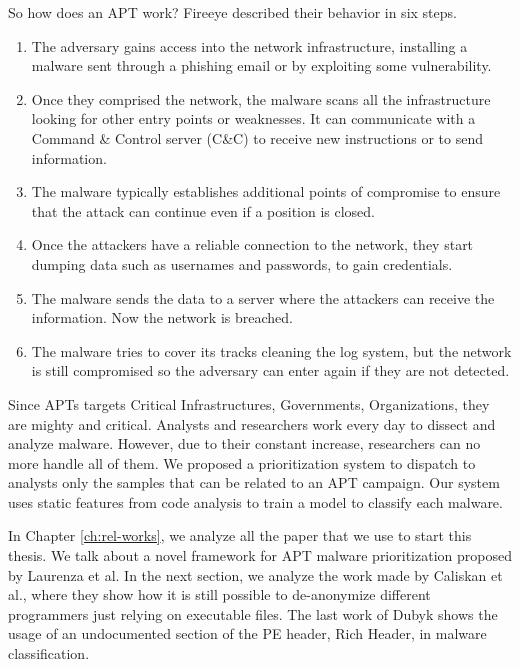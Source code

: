 So how does an APT work? Fireeye described their behavior in six steps. \cite{fireeye_anatomy}

\begin{enumerate}
	\item The adversary gains access into the network infrastructure, installing a malware sent through a phishing email or by exploiting some vulnerability.
	\item Once they comprised the network, the malware scans all the infrastructure looking for other entry points or weaknesses. It can communicate with a Command \& Control server (C\&C) to receive new instructions or to send information.
	\item The malware typically establishes additional points of compromise to ensure that the attack can continue even if a position is closed.
	\item Once the attackers have a reliable connection to the network, they start dumping data such as usernames and passwords, to gain credentials.
	
	\item The malware sends the data to a server where the attackers can receive the information. Now the network is breached.
	
	\item The malware tries to cover its tracks cleaning the log system, but the network is still compromised so the adversary can enter again if they are not detected.
\end{enumerate}

Since APTs targets Critical Infrastructures, Governments, Organizations, they are mighty and critical. Analysts and researchers work every day to dissect and analyze malware. However, due to their constant increase, researchers can no more handle all of them. We proposed a prioritization system to dispatch to analysts only the samples that can be related to an APT campaign. Our system uses static features from code analysis to train a model to classify each malware.

In Chapter \ref{ch:rel-works}, we analyze all the paper that we use to start this thesis. We talk about a novel framework for APT malware prioritization proposed by Laurenza et al. In the next section, we analyze the work made by Caliskan et al., where they show how it is still possible to de-anonymize different programmers just relying on executable files. The last work of Dubyk shows the usage of an undocumented section of the PE header, Rich Header, in malware classification.

